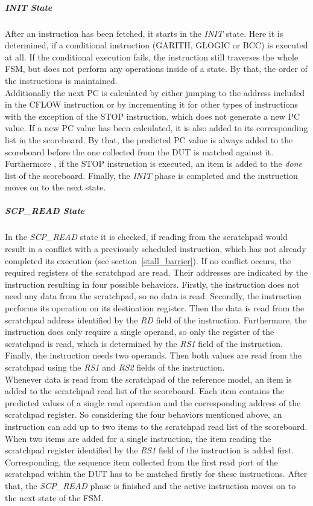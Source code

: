 \subparagraph{INIT State}

After an instruction has been fetched, it starts in the \emph{INIT} state.
Here it is determined, if a conditional instruction (GARITH, GLOGIC or BCC) is executed at all.
If the conditional execution fails, the instruction still traverses the whole FSM, but does not perform any operations inside of a state.
By that, the order of the instructions is maintained.\\
Additionally the next PC is calculated by either jumping to the address included in the CFLOW instruction or by incrementing it for other types of instructions
with the exception of the STOP instruction, which does not generate a new PC value.
If a new PC value has been calculated, it is also added to its corresponding list in the scoreboard.
By that, the predicted PC value is always added to the scoreboard before the one collected from the DUT is matched against it.
Furthermore , if the STOP instruction is executed, an item is added to the \emph{done} list of the scoreboard.
Finally, the \emph{INIT} phase is completed and the instruction moves on to the next state.

\subparagraph{SCP\_READ State}

In the \emph{SCP\_READ} state it is checked, if reading from the scratchpad would result in a conflict with a previously scheduled instruction, which has not
already completed its execution (see section~\ref{stall_barrier}).
If no conflict occurs, the required registers of the scratchpad are read.
Their addresses are indicated by the instruction resulting in four possible behaviors.
Firstly, the instruction does not need any data from the scratchpad, so no data is read.
Secondly, the instruction performs its operation on its destination register.
Then the data is read from the scratchpad address identified by the \emph{RD} field of the instruction.
Furthermore, the instruction does only require a single operand, so only the register of the scratchpad is read, which is determined by the \emph{RS1} field of
the instruction.
Finally, the instruction needs two operands.
Then both values are read from the scratchpad using the \emph{RS1} and \emph{RS2} fields of the instruction.\\
Whenever data is read from the scratchpad of the reference model, an item is added to the scratchpad read list of the scoreboard.
Each item contains the predicted values of a single read operation and the corresponding address of the scratchpad register.
So considering the four behaviors mentioned above, an instruction can add up to two items to the scratchpad read list of the scoreboard.
When two items are added for a single instruction, the item reading the scratchpad register identified by the \emph{RS1} field of the instruction is
added first.
Corresponding, the sequence item collected from the first read port of the scratchpad within the DUT has to be matched firstly for these instructions.
After that, the \emph{SCP\_READ} phase is finished and the active instruction moves on to the next state of the FSM.

